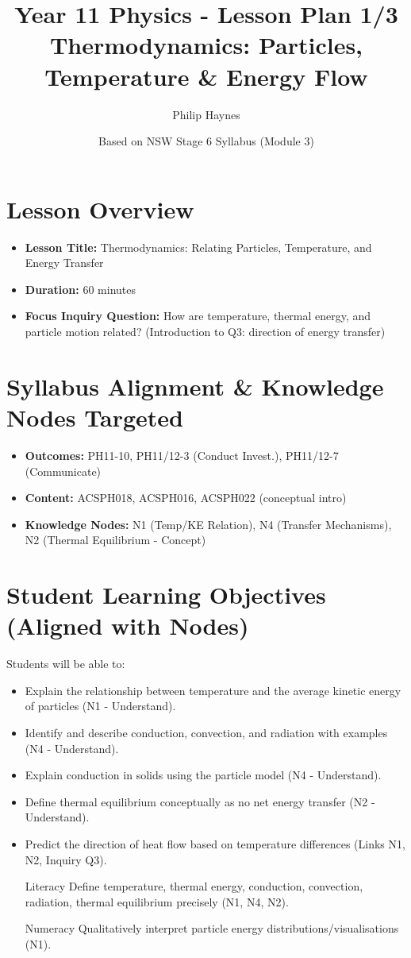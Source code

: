 \documentclass[11pt, a4paper]{article}
\title{Year 11 Physics - Lesson Plan 1/3 \\ Thermodynamics: Particles, Temperature & Energy Flow}
\date{Based on NSW Stage 6 Syllabus (Module 3)}
\author{Philip Haynes}
\begin{document}
\maketitle
\vspace{-2em} %

\section*{Lesson Overview}
\begin{itemize}
    \item \textbf{Lesson Title:} Thermodynamics: Relating Particles, Temperature, and Energy Transfer
    \item \textbf{Duration:} 60 minutes
    \item \textbf{Focus Inquiry Question:} How are temperature, thermal energy, and particle motion related? (Introduction to Q3: direction of energy transfer)
\end{itemize}

\section*{Syllabus Alignment & Knowledge Nodes Targeted}
\begin{itemize}
    \item \textbf{Outcomes:} PH11-10, PH11/12-3 (Conduct Invest.), PH11/12-7 (Communicate)
    \item \textbf{Content:} ACSPH018, ACSPH016, ACSPH022 (conceptual intro)
    \item \textbf{Knowledge Nodes:} N1 (Temp/KE Relation), N4 (Transfer Mechanisms), N2 (Thermal Equilibrium - Concept)
\end{itemize}

\section*{Student Learning Objectives (Aligned with Nodes)}
Students will be able to:
\begin{itemize}
    \item Explain the relationship between temperature and the average kinetic energy of particles (N1 - Understand).
    \item Identify and describe conduction, convection, and radiation with examples (N4 - Understand).
    \item Explain conduction in solids using the particle model (N4 - Understand).
    \item Define thermal equilibrium conceptually as no net energy transfer (N2 - Understand).
    \item Predict the direction of heat flow based on temperature differences (Links N1, N2, Inquiry Q3).
    \item [Literacy] Define temperature, thermal energy, conduction, convection, radiation, thermal equilibrium precisely (N1, N4, N2).
    \item [Numeracy] Qualitatively interpret particle energy distributions/visualisations (N1).
\end{itemize}
\end{document}
